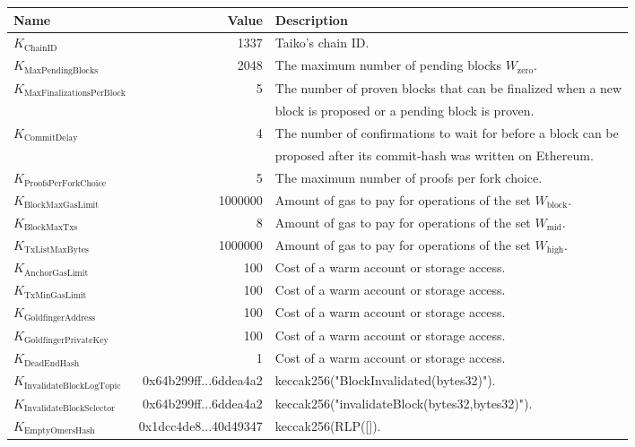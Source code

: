 \documentclass[9pt,oneside]{amsart}
\begin{document}
\nopagebreak
\begin{tabu}{l r l}
\toprule
Name & Value & Description \\
\midrule
$K_{\mathrm{ChainID}}$ & 1337 & Taiko's chain ID. \\
$K_{\mathrm{MaxPendingBlocks}}$ & 2048 & The maximum number of pending blocks {\small $W_{\mathrm{zero}}$}. \\
$K_{\mathrm{MaxFinalizationsPerBlock}}$ & 5 & The number of proven blocks that can be finalized when a new\\
& & block is proposed or a pending block is proven. \\
$K_{\mathrm{CommitDelay}}$ & 4 & The number of confirmations to wait for before a block can be\\
& & proposed after its commit-hash was written on Ethereum.\\
$K_{\mathrm{ProofsPerForkChoice}}$ & 5 & The maximum number of proofs per fork choice. \\
$K_{\mathrm{BlockMaxGasLimit}}$ & 1000000 & Amount of gas to pay for operations of the set {\small $W_{\mathrm{block}}$}. \\
$K_{\mathrm{BlockMaxTxs}}$ & 8 & Amount of gas to pay for operations of the set {\small $W_{\mathrm{mid}}$}. \\
$K_{\mathrm{TxListMaxBytes}}$ & 1000000 & Amount of gas to pay for operations of the set {\small $W_{\mathrm{high}}$}. \\
$K_{\mathrm{AnchorGasLimit}}$ & 100 & Cost of a warm account or storage access. \\
$K_{\mathrm{TxMinGasLimit}}$ & 100 & Cost of a warm account or storage access. \\
$K_{\mathrm{GoldfingerAddress}}$ & 100 & Cost of a warm account or storage access. \\
$K_{\mathrm{GoldfingerPrivateKey}}$ & 100 & Cost of a warm account or storage access. \\
$K_{\mathrm{DeadEndHash}}$ & 1 & Cost of a warm account or storage access. \\
$K_{\mathrm{InvalidateBlockLogTopic}}$ & 0x64b299ff...6ddea4a2 & keccak256("BlockInvalidated(bytes32)"). \\
$K_{\mathrm{InvalidateBlockSelector}}$ & 0x64b299ff...6ddea4a2 & keccak256("invalidateBlock(bytes32,bytes32)"). \\
$K_{\mathrm{EmptyOmersHash}}$ & 0x1dcc4de8...40d49347 & keccak256(RLP([]). \\
\bottomrule
\end{tabu}
\end{document}
